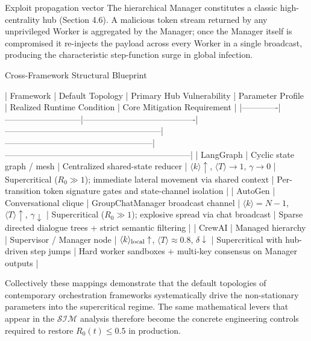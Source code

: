 Exploit propagation vector  
The hierarchical Manager constitutes a classic high-centrality hub (Section 4.6). A malicious token stream returned by any unprivileged Worker is aggregated by the Manager; once the Manager itself is compromised it re-injects the payload across every Worker in a single broadcast, producing the characteristic step-function surge in global infection.

Cross-Framework Structural Blueprint

| Framework   | Default Topology          | Primary Hub Vulnerability              | Parameter Profile                                      | Realized Runtime Condition                          | Core Mitigation Requirement                                      |
|-------------|---------------------------|----------------------------------------|--------------------------------------------------------|-----------------------------------------------------|------------------------------------------------------------------|
| LangGraph   | Cyclic state graph / mesh | Centralized shared-state reducer       | \(\langle k\rangle\uparrow\), \(\langle T\rangle\to 1\), \(\gamma\to 0\) | Supercritical (\(R_0\gg 1\)); immediate lateral movement via shared context | Per-transition token signature gates and state-channel isolation |
| AutoGen     | Conversational clique     | GroupChatManager broadcast channel     | \(\langle k\rangle=N-1\), \(\langle T\rangle\uparrow\), \(\gamma\downarrow\) | Supercritical (\(R_0\gg 1\)); explosive spread via chat broadcast | Sparse directed dialogue trees + strict semantic filtering       |
| CrewAI      | Managed hierarchy         | Supervisor / Manager node              | \(\langle k\rangle_{\rm local}\uparrow\), \(\langle T\rangle\approx 0.8\), \(\delta\downarrow\) | Supercritical with hub-driven step jumps             | Hard worker sandboxes + multi-key consensus on Manager outputs   |

Collectively these mappings demonstrate that the default topologies of contemporary orchestration frameworks systematically drive the non-stationary parameters into the supercritical regime. The same mathematical levers that appear in the \(\mathcal{S}\mathcal{I}\mathcal{M}\) analysis therefore become the concrete engineering controls required to restore \(R_0(t)\le 0.5\) in production.
